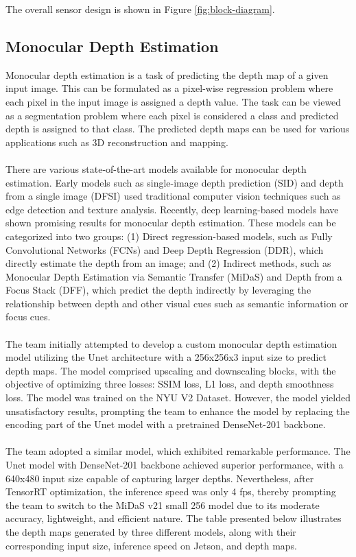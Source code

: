 \documentclass[conference]{IEEEtran}
\begin{document}
The overall sensor design is shown in Figure \ref{fig:block-diagram}.

\FloatBarrier

\subsection{Monocular Depth Estimation}
Monocular depth estimation is a task of predicting the depth map of a given input image. This can be formulated as a pixel-wise regression problem where each pixel in the input image is assigned a depth value. The task can be viewed as a segmentation problem where each pixel is considered a class and predicted depth is assigned to that class. The predicted depth maps can be used for various applications such as 3D reconstruction and mapping.\\
\\
There are various state-of-the-art models available for monocular depth estimation. Early models such as single-image depth prediction (SID) and depth from a single image (DFSI) used traditional computer vision techniques such as edge detection and texture analysis. Recently, deep learning-based models have shown promising results for monocular depth estimation. These models can be categorized into two groups: (1) Direct regression-based models, such as Fully Convolutional Networks (FCNs) and Deep Depth Regression (DDR), which directly estimate the depth from an image; and (2) Indirect methods, such as Monocular Depth Estimation via Semantic Transfer (MiDaS) and Depth from a Focus Stack (DFF), which predict the depth indirectly by leveraging the relationship between depth and other visual cues such as semantic information or focus cues.\\
\\
The team initially attempted to develop a custom monocular depth estimation model utilizing the Unet architecture with a 256x256x3 input size to predict depth maps. The model comprised upscaling and downscaling blocks, with the objective of optimizing three losses: SSIM loss, L1 loss, and depth smoothness loss. The model was trained on the NYU V2 Dataset. However, the model yielded unsatisfactory results, prompting the team to enhance the model by replacing the encoding part of the Unet model with a pretrained DenseNet-201 backbone.\\
\\
The team adopted a similar model, which exhibited remarkable performance. The Unet model with DenseNet-201 backbone achieved superior performance, with a 640x480 input size capable of capturing larger depths. Nevertheless, after TensorRT optimization, the inference speed was only 4 fps, thereby prompting the team to switch to the MiDaS v21 small 256 model due to its moderate accuracy, lightweight, and efficient nature. The table presented below illustrates the depth maps generated by three different models, along with their corresponding input size, inference speed on Jetson, and depth maps.
\end{document}
